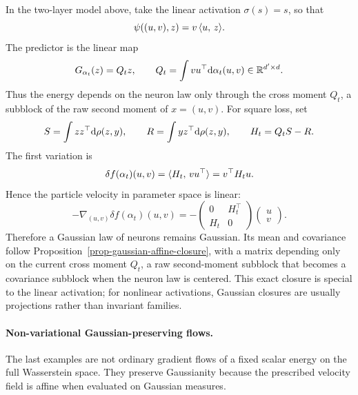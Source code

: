 \begin{example}
	In the two-layer model above, take the linear activation $\sigma(s)=s$, so that
	\[
		\psi((u,v),z)=v\,\langle u,\,z\rangle.
	\]
	The predictor is the linear map
	\[
		G_{\alpha_t}(z)=Q_t z,
		\qquad
		Q_t=\int v u^\top\mathrm{d}\alpha_t(u,v)\in\mathbb{R}^{d'\times d}.
	\]
	Thus the energy depends on the neuron law only through the cross moment $Q_t$, a subblock of the raw second moment of $x=(u,v)$. For square loss, set
	\[
		S=\int zz^\top\mathrm{d}\rho(z,y),
		\qquad
		R=\int y z^\top\mathrm{d}\rho(z,y),
		\qquad
		H_t=Q_tS-R.
	\]
	The first variation is
	\[
		\delta f(\alpha_t)(u,v)=\langle H_t,\,v u^\top\rangle=v^\top H_t u.
	\]
	Hence the particle velocity in parameter space is linear:
	\[
		-\nabla_{(u,v)}\delta f(\alpha_t)(u,v)
		=
		-\begin{pmatrix}
			0 & H_t^\top \\
			H_t & 0
		\end{pmatrix}
		\begin{pmatrix} u \\ v \end{pmatrix}.
	\]
	Therefore a Gaussian law of neurons remains Gaussian. Its mean and covariance follow Proposition~\ref{prop-gaussian-affine-closure}, with a matrix depending only on the current cross moment $Q_t$, a raw second-moment subblock that becomes a covariance subblock when the neuron law is centered. This exact closure is special to the linear activation; for nonlinear activations, Gaussian closures are usually projections rather than invariant families.
\end{example}

\paragraph{Non-variational Gaussian-preserving flows.}

The last examples are not ordinary gradient flows of a fixed scalar energy on the full Wasserstein space. They preserve Gaussianity because the prescribed velocity field is affine when evaluated on Gaussian measures.

